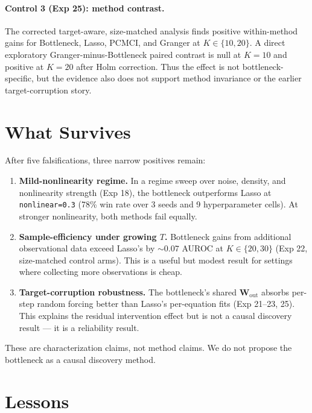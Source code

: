 \documentclass{article}
\begin{document}
\paragraph{Control 3 (Exp 25): method contrast.}
The corrected target-aware, size-matched analysis finds positive
within-method gains for Bottleneck, Lasso, PCMCI, and Granger at
$K\in\{10,20\}$. A direct exploratory Granger-minus-Bottleneck paired
contrast is null at $K=10$ and positive at $K=20$ after Holm correction.
Thus the effect is not bottleneck-specific, but the evidence also does not
support method invariance or the earlier target-corruption story.

\section{What Survives}
\label{sec:survives}

After five falsifications, three narrow positives remain:

\begin{enumerate}
  \item \textbf{Mild-nonlinearity regime.} In a regime sweep over
  noise, density, and nonlinearity strength (Exp 18), the bottleneck
  outperforms Lasso at \texttt{nonlinear=0.3} (78\% win rate over 3
  seeds and 9 hyperparameter cells). At stronger nonlinearity,
  both methods fail equally.
  \item \textbf{Sample-efficiency under growing $T$.} Bottleneck
  gains from additional observational data exceed Lasso's by
  $\sim 0.07$ AUROC at $K \in \{20, 30\}$ (Exp 22, size-matched
  control arms). This is a useful but modest result for settings
  where collecting more observations is cheap.
  \item \textbf{Target-corruption robustness.} The bottleneck's
  shared $\mathbf{W}_{\text{out}}$ absorbs per-step random
  forcing better than Lasso's per-equation fits (Exp 21--23, 25).
  This explains the residual intervention effect but is not a causal
  discovery result — it is a reliability result.
\end{enumerate}

These are characterization claims, not method claims. We do not
propose the bottleneck as a causal discovery method.

\section{Lessons}
\end{document}
